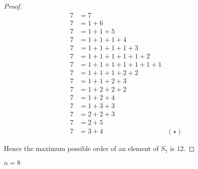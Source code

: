 \begin{proof}
    \begin{align*}
        7 & = 7                                   \\
        7 & = 1 + 6                               \\
        7 & = 1 + 1 + 5                           \\
        7 & = 1 + 1 + 1 + 4                       \\
        7 & = 1 + 1 + 1 + 1 + 3                   \\
        7 & = 1 + 1 + 1 + 1 + 1 + 2               \\
        7 & = 1 + 1 + 1 + 1 + 1 + 1 + 1           \\
        7 & = 1 + 1 + 1 + 2 + 2                   \\
        7 & = 1 + 1 + 2 + 3                       \\
        7 & = 1 + 2 + 2 + 2                       \\
        7 & = 1 + 2 + 4                           \\
        7 & = 1 + 3 + 3                           \\
        7 & = 2 + 2 + 3                           \\
        7 & = 2 + 5                               \\
        7 & = 3 + 4                     & (\star)
    \end{align*}

    Hence the maximum possible order of an element of $S_{7}$ is $12$.
\end{proof}

\newpage
\begin{exercise}
    $n = 8$
\end{exercise}

